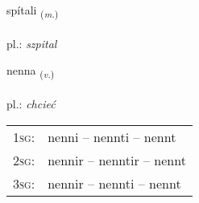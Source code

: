 \documentclass[frontgrid, backgrid]{flacards}\usepackage[]{graphicx}\usepackage[]{xcolor}
\begin{document}
\renewcommand{\flhead}{\vskip5pt \fboxsep=0pt {\small\bfseries\footnotesize Nafnorð | rzeczownik}}
\renewcommand{\fcfoot}{\vskip5pt \fboxsep=0pt \hspace{2pt}{\small\bfseries\footnotesize 3K}}

\renewcommand{\blhead}{\vskip5pt {\small\bfseries\footnotesize Nafnorð | rzeczownik }}
\renewcommand{\bcfoot}{\vskip5pt \hspace{2pt}{\small\bfseries\footnotesize 3K}}


{spítali \small{\textsubscript{(\textit{m.})}} \\[1ex] %
\textphonetic{[spiːtalɪ]} \\
pl.: \emph{szpital} \\  [2ex]
\renewcommand*{\arraystretch}{0.8}
}

\renewcommand{\flhead}{\vskip5pt \fboxsep=0pt {\small\bfseries\footnotesize Sagnorð | czasownik}}
\renewcommand{\fcfoot}{\vskip5pt \fboxsep=0pt \hspace{2pt}{\small\bfseries\footnotesize 3K}}

\renewcommand{\blhead}{\vskip5pt {\small\bfseries\footnotesize Sagnorð | czasownik }}
\renewcommand{\bcfoot}{\vskip5pt \hspace{2pt}{\small\bfseries\footnotesize 3K}}


{nenna \small{\textsubscript{(\textit{v.})}} \\[1ex] %
\textphonetic{[nɛna]} \\
pl.: \emph{chcieć} \\  [2ex]
\renewcommand*{\arraystretch}{0.8}
\begin{tabular}{p{1cm}l}
\textsc{1sg}: & nenni -- nennti -- nennt \\ 
\textsc{2sg}: & nennir -- nenntir -- nennt \\ 
\textsc{3sg}: & nennir -- nennti -- nennt \\ 
\end{tabular}
}
\end{document}
